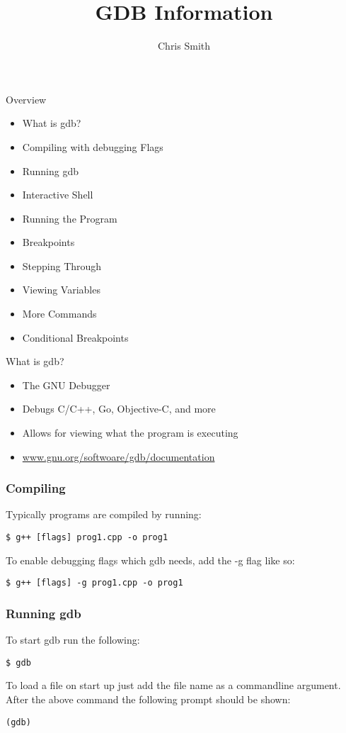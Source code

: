 \documentclass[11pt]{beamer}
\author{Chris Smith}
\title{GDB Information}
\institute{SDSMT ACM/LUG}
\begin{document}
\begin{frame}
\titlepage
\end{frame}

\begin{frame}{Overview}
\begin{itemize}
\item What is gdb?
\item Compiling with debugging Flags
\item Running gdb
\item Interactive Shell
\item Running the Program
\item Breakpoints
\item Stepping Through
\item Viewing Variables
\item More Commands
\item Conditional Breakpoints
\end{itemize}
\end{frame}


\begin{frame}{What is gdb?}
\begin{itemize}
\item The GNU Debugger
\item Debugs C/C++, Go, Objective-C, and more
\item Allows for viewing what the program is executing
\item \href{https://www.gnu.org/software/gdb/documentation/}{www.gnu.org/softwoare/gdb/documentation}
\end{itemize}
\end{frame}

\begin{frame}[fragile]
\frametitle{Compiling}
Typically programs are compiled by running:
\begin{lstlisting}[style=BashInputStyle]
 $ g++ [flags] prog1.cpp -o prog1
\end{lstlisting}
To enable debugging flags which gdb needs, add the -g flag like so:
\begin{lstlisting}[style=BashInputStyle]
 $ g++ [flags] -g prog1.cpp -o prog1
\end{lstlisting}
\end{frame}

\begin{frame}[fragile]
\frametitle{Running gdb}
To start gdb run the following:
\begin{lstlisting}[style=BashInputStyle]
 $ gdb
\end{lstlisting}
 To load a file on start up just add the file name as a commandline argument. \\
 After the above command the following prompt should be shown:
\begin{lstlisting}[style=BashInputStyle]
 (gdb)
\end{lstlisting}
\end{frame}
\end{document}
